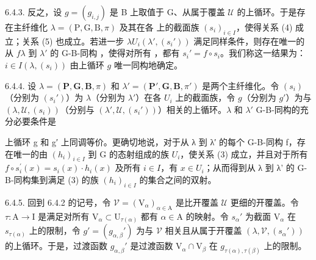 6.4.3. 反之，设 \(g = (g_{i,j})\) 是 B 上取值于 G、从属于覆盖 \(\mathcal{U}\) 的上循环。于是存在主纤维化 \(\lambda = (\mathrm{P},\mathrm{G},\mathrm{B},\pi)\) 及其在各  上的截面族 \((s_i)_{i\in I}\)，使得关系 (4) 成立；关系 (5) 也成立。若进一步 \(\lambda\)\(U_i\)\((\lambda',(s_i'))\) 满足同样条件，则存在唯一的从 \(f\)\(\lambda\) 到 \(\lambda'\) 的 G-B-同构 ，使得对所有 ，都有 \(s_i' = f\circ s_i\)。我们称这一结果为：\(i\in I\)\((\lambda,(s_i))\) 由上循环 \(g\) 唯一同构地确定。

6.4.4. 设 \(\lambda = (\mathbf{P}, \mathbf{G}, \mathbf{B}, \pi)\) 和 \(\lambda' = (\mathbf{P}', \mathbf{G}, \mathbf{B}, \pi')\) 是两个主纤维化。令 \((s_i)\)（分别为 \((s_i')\)）为 \(\lambda\)（分别为 \(\lambda'\)）在各 \(U_i\) 上的截面族，令 \(g\)（分别为 \(g'\)）为与 \((\lambda, \mathcal{U}, (s_i))\)（分别与 \((\lambda', \mathcal{U}, (s_i'))\)）相关的上循环。\(\lambda\) 和 \(\lambda'\) G-B-同构的充分必要条件是

上循环 g 和 g′ 上同调等价。更确切地说，对于从 λ 到 λ′ 的每个 G-B-同构 f，存在唯一的由 \((h_{i})_{i\in I}\) 到 G 的态射组成的族 \(U_{i}\)，使关系 (3) 成立，并且对于所有 \(f\circ s_{i}^{\prime}(x)=s_{i}(x) \cdot h_{i}(x)\) 及所有 \(i\in I\)，有 \(x\in U_{i}\)；从而得到从 λ 到 λ' 的 G-B-同构集到满足 (3) 的族 \((h_{i})_{i\in I}\) 的集合之间的双射。

6.4.5. 回到 6.4.2 的记号，令 \(\mathcal{V} = (\mathrm{V}_{\alpha})_{\alpha \in \mathrm{A}}\) 是比开覆盖 \(\mathcal{U}\) 更细的开覆盖。令 \(\tau : \mathrm{A} \to \mathrm{I}\) 是满足对所有 \(\mathrm{V}_{\alpha} \subset \mathrm{U}_{\tau(\alpha)}\) 都有 \(\alpha \in \mathrm{A}\) 的映射。令 \(s_{\alpha}'\) 为截面 \(\mathrm{V}_{\alpha}\) 在 \(s_{\tau(\alpha)}\) 上的限制，令 \(g' = (g_{\alpha,\beta}')\) 为与 \(\mathcal{V}\) 相关且从属于开覆盖 \((\lambda, \mathcal{V}, (s_{\alpha}'))\) 的上循环。于是，过渡函数 \(g_{\alpha,\beta}'\) 是过渡函数 \(\mathrm{V}_{\alpha} \cap \mathrm{V}_{\beta}\) 在 \(g_{\tau(\alpha),\tau(\beta)}\) 上的限制。

